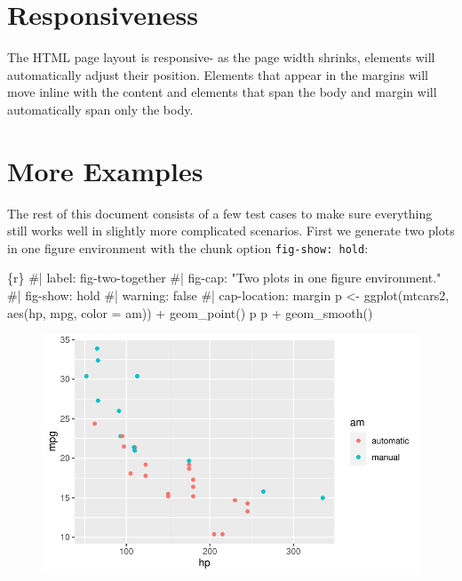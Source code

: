 \documentclass[
  letterpaper,
  DIV=11,
  numbers=noendperiod,
  oneside]{scrartcl}
\newenvironment{Shaded}{\begin{snugshade}}{\end{snugshade}}
\newcommand{\AttributeTok}[1]{\textcolor[rgb]{0.40,0.45,0.13}{#1}}
\newcommand{\CommentTok}[1]{\textcolor[rgb]{0.37,0.37,0.37}{#1}}
\newcommand{\FunctionTok}[1]{\textcolor[rgb]{0.28,0.35,0.67}{#1}}
\newcommand{\InformationTok}[1]{\textcolor[rgb]{0.37,0.37,0.37}{#1}}
\newcommand{\NormalTok}[1]{\textcolor[rgb]{0.00,0.23,0.31}{#1}}
\newcommand{\OtherTok}[1]{\textcolor[rgb]{0.00,0.23,0.31}{#1}}
\newcommand{\SpecialCharTok}[1]{\textcolor[rgb]{0.37,0.37,0.37}{#1}}
\begin{document}
\hypertarget{responsiveness}{%
\section{Responsiveness}\label{responsiveness}}

The HTML page layout is responsive- as the page width shrinks, elements
will automatically adjust their position. Elements that appear in the
margins will move inline with the content and elements that span the
body and margin will automatically span only the body.

\hypertarget{more-examples}{%
\section{More Examples}\label{more-examples}}

The rest of this document consists of a few test cases to make sure
everything still works well in slightly more complicated scenarios.
First we generate two plots in one figure environment with the chunk
option \texttt{fig-show:\ hold}:

\begin{Shaded}
\begin{Highlighting}[]
\InformationTok{\textasciigrave{}\textasciigrave{}\textasciigrave{}\{r\}}
\CommentTok{\#| label: fig{-}two{-}together}
\CommentTok{\#| fig{-}cap: "Two plots in one figure environment."}
\CommentTok{\#| fig{-}show: hold}
\CommentTok{\#| warning: false}
\CommentTok{\#| cap{-}location: margin}
\NormalTok{p }\OtherTok{\textless{}{-}} \FunctionTok{ggplot}\NormalTok{(mtcars2, }\FunctionTok{aes}\NormalTok{(hp, mpg, }\AttributeTok{color =}\NormalTok{ am)) }\SpecialCharTok{+}
  \FunctionTok{geom\_point}\NormalTok{()}
\NormalTok{p}
\NormalTok{p }\SpecialCharTok{+} \FunctionTok{geom\_smooth}\NormalTok{()}
\InformationTok{\textasciigrave{}\textasciigrave{}\textasciigrave{}}
\end{Highlighting}
\end{Shaded}

\begin{figure}[H]


{\centering \includegraphics{HousePrices_files/figure-pdf/fig-two-together-1.pdf}

}

\end{figure}
\end{document}
